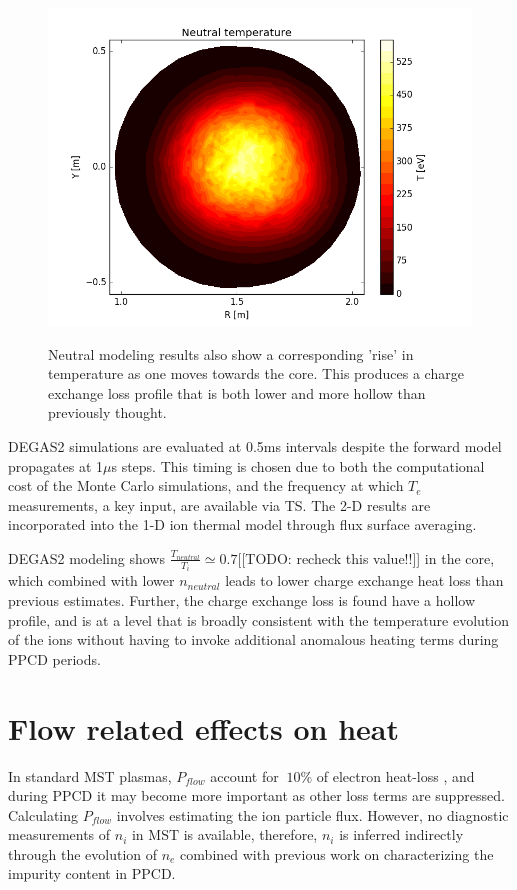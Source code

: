 \documentclass[aip, pop, preprint]{revtex4-1}
\begin{document}
\begin{figure}
	\centering
	\includegraphics[width = 1.\linewidth]{./plots/degas_neutral_t}
	\label{fig:DEGAS2_2d_temp}
	\caption{Neutral modeling results also show a corresponding 'rise' in temperature as one moves towards the core. This produces a charge exchange loss profile that is both lower and more hollow than previously thought.}
	\label{fig:DEGAS2_2D}
\end{figure}

DEGAS2 simulations are evaluated at 0.5ms intervals despite the forward model
propagates at 1$\mu$s steps.  This timing is chosen due to both the
computational cost of the Monte Carlo simulations, and the frequency at which $
T_e $ measurements, a key input, are available via TS. The 2-D results are
incorporated into the 1-D ion thermal model through flux surface averaging.

DEGAS2 modeling shows $\frac{T_{neutral}}{T_{i}} \simeq 0.7$[[TODO: recheck
this value!!]] in the core, which combined with lower $ n_{neutral} $ leads to
lower charge exchange heat loss than previous estimates. Further, the charge
exchange loss is found have a hollow profile, and is at a level that is broadly
consistent with the temperature evolution of the ions without having to invoke
additional anomalous heating terms during PPCD periods. 

\section{Flow related effects on heat}\label{flow_effects}

In standard MST plasmas, $P_{flow}$ account for $ ~10\% $ of electron heat-loss
\cite{BiewerThesis}, and during PPCD it may become more important as other loss
terms are suppressed. Calculating $P_{flow}$ involves estimating the ion
particle flux.  However, no diagnostic measurements of $n_i$ in MST is
available, therefore, $n_i$ is inferred indirectly through the evolution of
$n_e$ combined with previous work on characterizing the impurity content in
PPCD\cite{Kumar12pop,Nornberg18FST}.
\end{document}
